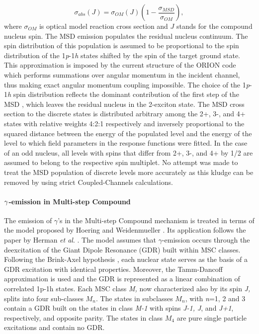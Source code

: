 \begin{equation}
\sigma_{abs}(J)=\sigma_{OM}(J)\left(1-%
\frac{\sigma_{MSD}}{\sigma_{OM}}\right),  \label{CNabs}
\end{equation}
\noindent where $\sigma_{OM}$ is optical model reaction cross section and $J$
stands for the compound nucleus spin. The MSD%
 emission populates the residual nucleus continuum.
 The spin distribution
of this population is assumed to be proportional to the spin distribution of
the 1\emph{p}-1\emph{h} states shifted by the spin of the target ground state.
This approximation is imposed by the current structure of the ORION%
 code which performs summations over angular momentum in the
incident channel, thus making exact angular momentum coupling impossible.
The choice of the 1\emph{p}-1\emph{h} spin distribution reflects the dominant
contribution of the first step of the MSD%
, which leaves the residual nucleus in the 2-exciton state. The
MSD%
 cross section to the discrete states is distributed arbitrary
among the 2+, 3-, and 4+ states with relative weights 4:2:1 respectively and
inversely proportional to the squared distance between the energy of the
populated level and the energy of the level to which field parameters in the
response functions were fitted. In the case of an odd nucleus, all levels
with spins that differ from 2+, 3-, and 4+ by 1/2 are assumed to belong to
the respective spin multiplet. No attempt was made to treat the MSD%
 population of discrete levels more accurately as this kludge can
be removed by using strict Coupled-Channels calculations.

\medskip

\paragraph{$\protect\gamma$-emission in Multi-step Compound}

The emission of $\gamma$'s in the Multi-step Compound%
 mechanism is treated in terms of the model proposed by Hoering
and Weidenmueller \cite{GammaMSC}. Its application follows the paper by Herman
\emph{et al}. \cite{GammaMSCapp}. The model assumes that $\gamma$-emission
occurs through the deexcitation of the Giant Dipole Resonance (GDR) built
within MSC%
 classes. Following the
Brink-Axel hypothesis \cite{Axel,Brink,Brinka},
each nuclear state serves as the basis of a GDR excitation with identical
properties. Moreover, the Tamm-Dancoff approximation is used and the GDR is
represented as a linear combination of correlated 1p-1h states. Each MSC
class \emph{M,} now characterized also by its spin \emph{J,} splits into
four sub-classes $M_{n}$. The states in subclasses $M_{n}$, with \emph{n}=1,
2 and 3 contain a GDR built on the states in class \emph{M-1} with
spins \emph{J-1, J}, and \emph{J+1}, respectively, and opposite
parity. The states in
class $M_{4}$ are pure single particle excitations and contain no GDR.

